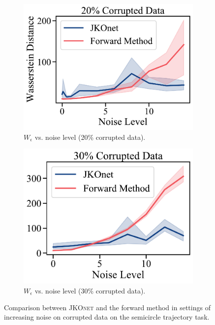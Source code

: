 \begin{figure}[t]
     \begin{subfigure}[t]{0.485\textwidth}
         \centering
         \includegraphics[width=\textwidth]{figures/fig_fb_comp_noise_20.pdf}
         \caption{$W_\epsilon$ vs. noise level (20\% corrupted data).}
     \end{subfigure}
     \hfill
     \begin{subfigure}[t]{0.46\textwidth}
         \centering
         \includegraphics[width=\textwidth]{figures/fig_fb_comp_noise_30.pdf}
         \caption{$W_\epsilon$ vs. noise level (30\% corrupted data).}
     \end{subfigure}
     \caption{Comparison between \textsc{JKOnet} and the forward method in settings of increasing noise on corrupted data on the semicircle trajectory task.}
     \label{fig:exp_comp_noise}
\end{figure}


